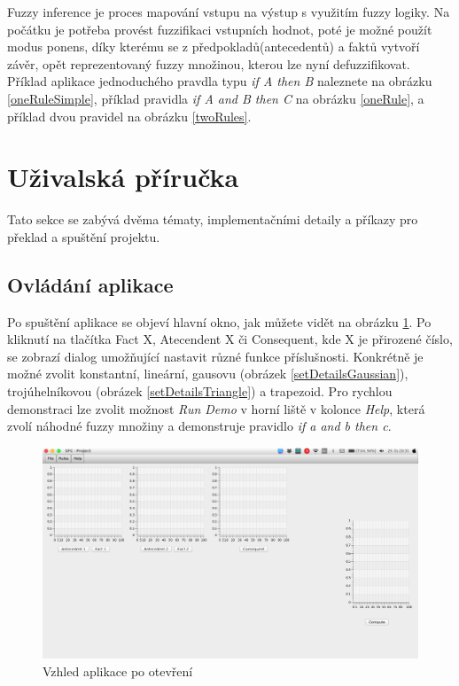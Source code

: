 \documentclass[12pt,a4paper,titlepage]{article}
\begin{document}
Fuzzy inference je proces mapování vstupu na výstup s využitím fuzzy logiky. Na počátku je potřeba provést fuzzifikaci vstupních hodnot, poté je možné použít modus ponens, díky kterému se z předpokladů(antecedentů) a faktů vytvoří závěr, opět reprezentovaný fuzzy množinou, kterou lze nyní defuzzifikovat.  Příklad aplikace jednoduchého pravdla typu \textit{if A then B} naleznete na obrázku \ref{oneRuleSimple}, příklad pravidla \textit{if A and B then C} na obrázku \ref{oneRule}, a příklad dvou pravidel na obrázku \ref{twoRules}.


\section{Uživalská příručka}
Tato sekce se zabývá dvěma tématy, implementačními detaily a příkazy pro překlad a spuštění projektu.

\subsection{Ovládání aplikace}
Po spuštění aplikace se objeví hlavní okno, jak můžete vidět na obrázku \ref{emptyWindow}. Po kliknutí na tlačítka Fact X, Atecendent X či Consequent, kde X je přirozené číslo, se zobrazí dialog umožňující nastavit různé funkce příslušnosti. Konkrétně je možné zvolit konstantní, lineární, gausovu (obrázek \ref{setDetailsGaussian}), trojúhelníkovou (obrázek \ref{setDetailsTriangle}) a trapezoid. Pro rychlou demonstraci lze zvolit možnost \textit{Run Demo} v horní liště v kolonce \textit{Help}, která zvolí náhodné fuzzy množiny a demonstruje pravidlo \textit{if a and b then c}.

\begin{figure}[!htbp]
	\centering
	\includegraphics[scale=0.3]{emptyWindow}
	\caption{Vzhled aplikace po otevření}
	\label{emptyWindow}
\end{figure}
\end{document}
